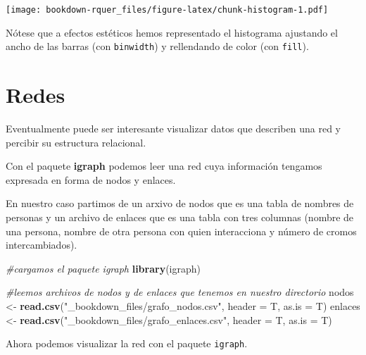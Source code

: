 \documentclass[]{book}
\newenvironment{Shaded}{\begin{snugshade}}{\end{snugshade}}
\newcommand{\CommentTok}[1]{\textcolor[rgb]{0.56,0.35,0.01}{\textit{#1}}}
\newcommand{\DataTypeTok}[1]{\textcolor[rgb]{0.13,0.29,0.53}{#1}}
\newcommand{\KeywordTok}[1]{\textcolor[rgb]{0.13,0.29,0.53}{\textbf{#1}}}
\newcommand{\NormalTok}[1]{#1}
\newcommand{\StringTok}[1]{\textcolor[rgb]{0.31,0.60,0.02}{#1}}
\theoremstyle{definition}
\theoremstyle{definition}
\theoremstyle{definition}
\theoremstyle{remark}
\begin{document}
\texttt{[image: bookdown-rquer\_files/figure-latex/chunk-histogram-1.pdf]}

Nótese que a efectos estéticos hemos representado el histograma
ajustando el ancho de las barras (con \texttt{binwidth}) y rellendando
de color (con \texttt{fill}).

\hypertarget{redes}{%
\section{Redes}\label{redes}}

Eventualmente puede ser interesante visualizar datos que describen una
red y percibir su estructura relacional.

Con el paquete \textbf{igraph} \citep{R-igraph} podemos leer una red
cuya información tengamos expresada en forma de nodos y enlaces.

En nuestro caso partimos de un arxivo de nodos que es una tabla de
nombres de personas y un archivo de enlaces que es una tabla con tres
columnas (nombre de una persona, nombre de otra persona con quien
interacciona y número de cromos intercambiados).

\begin{Shaded}
\begin{Highlighting}[]
\CommentTok{#cargamos el paquete igraph}
\KeywordTok{library}\NormalTok{(igraph)}

\CommentTok{#leemos archivos de nodos y de enlaces que tenemos en nuestro directorio}
\NormalTok{nodos <-}\StringTok{ }\KeywordTok{read.csv}\NormalTok{(}\StringTok{"_bookdown_files/grafo_nodos.csv"}\NormalTok{, }\DataTypeTok{header =}\NormalTok{ T, }\DataTypeTok{as.is =}\NormalTok{ T)}
\NormalTok{enlaces <-}\StringTok{ }\KeywordTok{read.csv}\NormalTok{(}\StringTok{"_bookdown_files/grafo_enlaces.csv"}\NormalTok{, }\DataTypeTok{header =}\NormalTok{ T, }\DataTypeTok{as.is =}\NormalTok{ T)}
\end{Highlighting}
\end{Shaded}

Ahora podemos visualizar la red con el paquete \texttt{igraph}.
\end{document}

